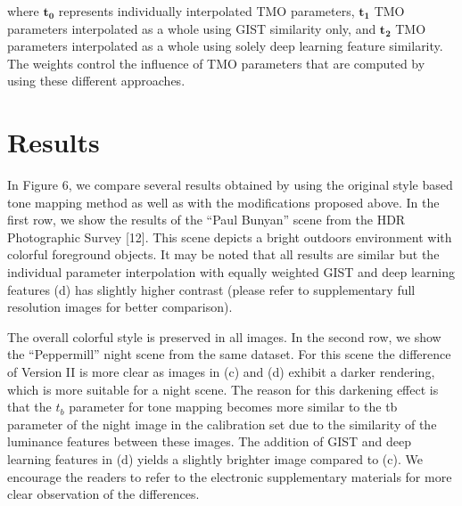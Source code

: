 where $\mathbf{t_0}$ represents individually interpolated TMO parameters, $\mathbf{t_1}$ TMO parameters interpolated as a whole using GIST similarity only, and $\mathbf{t_2}$ TMO parameters interpolated as a whole using solely deep learning feature similarity. The weights control the influence of TMO parameters that are computed by using these different approaches.

\section{Results}
In Figure 6, we compare several results obtained by using the original style based tone mapping method as well as with the modifications proposed above. In the first row, we show the results of the “Paul Bunyan” scene from the HDR Photographic Survey [12]. This scene depicts a bright outdoors environment with colorful foreground objects. It may be noted that all results are similar but the individual parameter interpolation with equally weighted GIST and deep learning features (d) has slightly higher contrast (please refer to supplementary full resolution images for better comparison).

The overall colorful style is preserved in all images. In the second row, we show the “Peppermill” night scene from the same dataset. For this scene the difference of Version II is more clear as images in (c) and (d) exhibit a darker rendering, which is more suitable for a night scene. The reason for this darkening effect is that the $t_b$ parameter for tone mapping becomes more similar to the tb parameter of the night image in the calibration set due to the similarity of the luminance features between these images. The addition of GIST and deep learning features in (d) yields a slightly brighter image compared to (c). We encourage the readers to refer to the electronic supplementary materials for more clear observation of the differences.